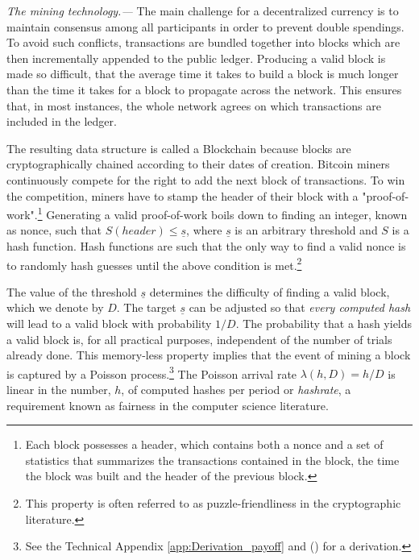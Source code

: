 \documentclass[12pt, a4paper]{article}
\makeatletter
\renewcommand{\subsection}{\@startsection{subsection}{2}{0mm}{-0.8\baselineskip}{.5\baselineskip}{\normalfont\normalsize\bfseries}}
\makeatother
\begin{document}
\subsection{Baseline Model}
\label{ssec:Baseline}
\emph{The mining technology.---} The main challenge for a decentralized currency is to maintain
consensus among all participants
in order to prevent double spendings. To avoid
such conflicts, transactions are bundled together into blocks which are then incrementally
appended to the public ledger. Producing
a valid block is made so difficult, that the average time it takes to
build a block is much longer than the time it takes for a block
to propagate across the network. This ensures that, in most instances, the
whole network agrees on which transactions are included in the ledger.

The resulting data structure is called a Blockchain because blocks are cryptographically
chained according to their dates of creation. Bitcoin miners
continuously compete for the right to add the next block of transactions.
To win the competition, miners have to stamp the header of their block with a
"proof-of-work".\footnote{Each block possesses a header, which contains both a
nonce and a set of statistics that summarizes the
transactions contained in the block, the time the block was built and the header of
the previous block.} Generating a valid proof-of-work boils down to finding
an integer, known as nonce,  such that
$S(header)\leq \underline{s}$, where $\underline{s}$ is an arbitrary threshold
and $S$ is a hash function.
Hash functions are such that the only way to find a valid nonce is to
randomly hash guesses until the above condition is met.\footnote{This property
is often referred to as puzzle-friendliness in the cryptographic literature.}

The value of the threshold $\underline{s}$ determines
the difficulty of finding a valid block, which we denote by $D$.
The target $\underline{s}$ can be adjusted so that \emph{every computed
hash} will lead to a valid block with probability $1/D$. The probability that a hash yields a valid block is, for all practical purposes, independent of the number of trials already done.
This memory-less property implies that the event of mining a block is captured by a Poisson process.\footnote{See the Technical Appendix
\ref{app:Derivation_payoff} and \citeauthor{Rosenfeld} (\citeyear{Rosenfeld}) for a derivation.} The Poisson arrival rate $\lambda(h,D)=h/D$
is linear in the number, $h$, of computed hashes per period or \emph{hashrate}, a requirement known as fairness in the computer science literature.
\end{document}
